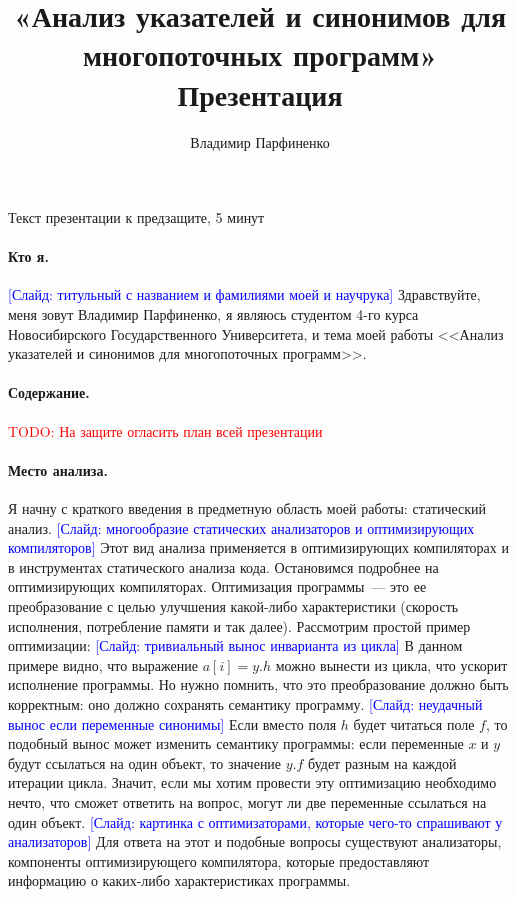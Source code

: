 \documentclass[12pt]{article}
\title{
  «Анализ указателей и синонимов для многопоточных программ»\\
  Презентация
}
\author{
  Владимир Парфиненко
}
\newcommand{\todo}[1]{\textcolor{red}{TODO: #1}}
\newcommand{\slide}[1]{\textcolor{Blue}{[Слайд: #1]}}
\begin{document}
  {\Large Текст презентации к предзащите, 5 минут}
  \vspace{5mm}

  \paragraph{Кто я.}
  \slide{титульный с названием и фамилиями моей и научрука}
  Здравствуйте, меня зовут Владимир Парфиненко, я являюсь студентом 4-го
  курса Новосибирского Государственного Университета, и тема моей работы
  <<Анализ указателей и синонимов для многопоточных программ>>.

  \paragraph{Содержание.} \todo{На защите огласить план всей презентации}

  \paragraph{Место анализа.}
  Я начну с краткого введения в предметную область моей работы: статический
  анализ.
  \slide{многообразие статических анализаторов и оптимизирующих компиляторов}
  Этот вид анализа применяется в оптимизирующих компиляторах и в инструментах
  статического анализа кода.  Остановимся подробнее на оптимизирующих
  компиляторах.
  Оптимизация программы~--- это ее преобразование с целью улучшения какой-либо
  характеристики (скорость исполнения, потребление памяти и так далее).
  Рассмотрим простой пример оптимизации:
  \slide{тривиальный вынос инварианта из цикла}
  В данном примере видно, что выражение $a[i] = y.h$ можно вынести из цикла,
  что ускорит исполнение программы. Но нужно помнить, что это преобразование
  должно быть корректным: оно должно сохранять семантику программу.
  \slide{неудачный вынос если переменные синонимы}
  Если вместо поля $h$ будет читаться поле $f$, то подобный вынос может
  изменить семантику программы: если переменные $x$ и $y$ будут ссылаться на
  один объект, то значение $y.f$ будет разным на каждой итерации цикла.
  Значит, если мы хотим провести эту оптимизацию необходимо нечто, что
  сможет ответить на вопрос, могут ли две переменные ссылаться на один объект.
  \slide{картинка с оптимизаторами, которые чего-то спрашивают у анализаторов}
  Для ответа на этот и подобные вопросы существуют
  анализаторы, компоненты оптимизирующего компилятора, которые предоставляют
  информацию о каких-либо характеристиках программы.
\end{document}
